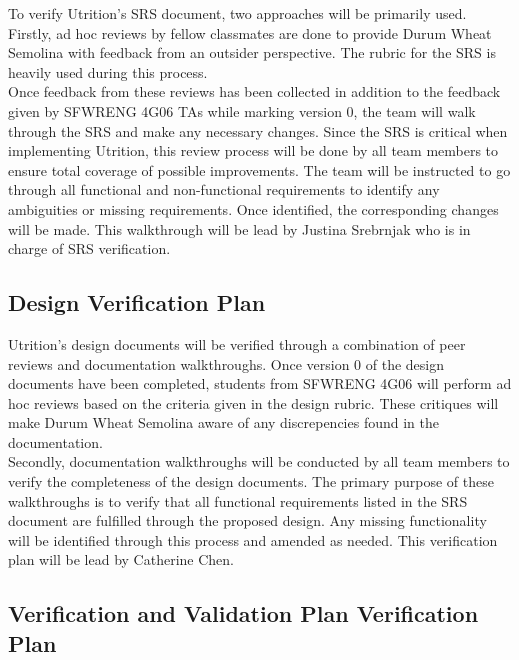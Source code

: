\documentclass[12pt, titlepage]{article}
\begin{document}
	To verify Utrition's SRS document, two approaches will be primarily used. Firstly, ad hoc reviews by fellow classmates are done to provide Durum Wheat Semolina with feedback from an outsider perspective. The rubric for the SRS is heavily used during this process. \\
	
	Once feedback from these reviews has been collected in addition to the feedback given by SFWRENG 4G06 TAs while marking version 0, the team will walk through the SRS and make any necessary changes. Since the SRS is critical when implementing Utrition, this review process will be done by all team members to ensure total coverage of possible improvements. The team will be instructed to go through all functional and non-functional requirements to identify any ambiguities or missing requirements. Once identified, the corresponding changes will be made. This walkthrough will be lead by Justina Srebrnjak who is in charge of SRS verification.

	\subsection{Design Verification Plan}
	
	
	
	
	Utrition's design documents will be verified through a combination of peer reviews and documentation walkthroughs. Once version 0 of the design documents have been completed, students from SFWRENG 4G06 will perform ad hoc reviews based on the criteria given in the design rubric. These critiques will make Durum Wheat Semolina aware of any discrepencies found in the documentation.\\
	
	Secondly, documentation walkthroughs will be conducted by all team members to verify the completeness of the design documents. The primary purpose of these walkthroughs is to verify that all functional requirements listed in the SRS document are fulfilled through the proposed design. Any missing functionality will be identified through this process and amended as needed. This verification plan will be lead by Catherine Chen.
	
	\subsection{Verification and Validation Plan Verification Plan}
	
\end{document}
